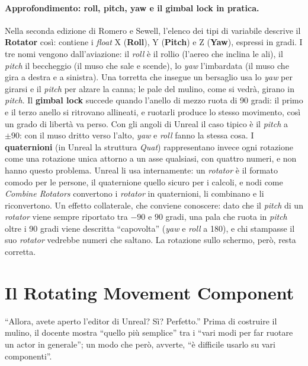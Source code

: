\paragraph{Approfondimento: roll, pitch, yaw e il gimbal lock in pratica.} Nella seconda
edizione di Romero e Sewell, l'elenco dei tipi di variabile descrive il
\textbf{Rotator} così: contiene i \emph{float} X (\textbf{Roll}), Y (\textbf{Pitch}) e
Z (\textbf{Yaw}), espressi in gradi. I tre nomi vengono dall'aviazione: il
\emph{roll} è il rollio (l'aereo che inclina le ali), il \emph{pitch} il beccheggio (il
muso che sale e scende), lo \emph{yaw} l'imbardata (il muso che gira a destra e a
sinistra). Una torretta che insegue un bersaglio usa lo \emph{yaw} per girarsi e il
\emph{pitch} per alzare la canna; le pale del mulino, come si vedrà, girano in
\emph{pitch}. Il \textbf{gimbal lock} succede quando l'anello di mezzo ruota di 90
gradi: il primo e il terzo anello si ritrovano allineati, e ruotarli produce lo stesso
movimento, così un grado di libertà va perso. Con gli angoli di Unreal il caso tipico
è il \emph{pitch} a $\pm 90$: con il muso dritto verso l'alto, \emph{yaw} e \emph{roll}
fanno la stessa cosa. I \textbf{quaternioni} (in Unreal la struttura \emph{Quat})
rappresentano invece ogni rotazione come una rotazione unica attorno a un asse
qualsiasi, con quattro numeri, e non hanno questo problema. Unreal li usa
internamente: un \emph{rotator} è il formato comodo per le persone, il quaternione
quello sicuro per i calcoli, e nodi come \emph{Combine Rotators} convertono i
\emph{rotator} in quaternioni, li combinano e li riconvertono. Un effetto collaterale,
che conviene conoscere: dato che il \emph{pitch} di un \emph{rotator} viene sempre
riportato tra $-90$ e $90$ gradi, una pala che ruota in \emph{pitch} oltre i 90 gradi
viene descritta ``capovolta'' (\emph{yaw} e \emph{roll} a 180), e chi stampasse il suo
\emph{rotator} vedrebbe numeri che saltano. La rotazione sullo schermo, però, resta
corretta.

\section{Il Rotating Movement Component}
\label{ue4:sec:rotating}

``Allora, avete aperto l'editor di Unreal? Sì? Perfetto.'' Prima di costruire il
mulino, il docente mostra ``quello più semplice'' tra i ``vari modi per far ruotare un
actor in generale''; un modo che però, avverte, ``è difficile usarlo su vari
componenti''.

